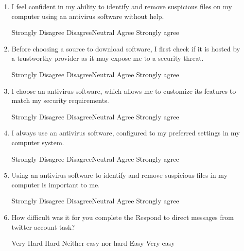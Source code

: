 \begin{enumerate}[noitemsep]
\item I feel confident in my ability to identify and remove suspicious files on my computer using an antivirus software without help.
\par Strongly Disagree \hspace{1cm} Disagree\hspace{1cm}Neutral\hspace{1cm} Agree\hspace{1cm} Strongly agree
\item Before choosing a source to download software, I first check if it is hosted by a trustworthy provider as it may expose me to a security threat.
\par Strongly Disagree \hspace{1cm} Disagree\hspace{1cm}Neutral\hspace{1cm} Agree\hspace{1cm} Strongly agree
\item I choose an antivirus software, which allows me to customize its features to match my security requirements.
\par Strongly Disagree \hspace{1cm} Disagree\hspace{1cm}Neutral\hspace{1cm} Agree\hspace{1cm} Strongly agree
\item I always use an antivirus software, configured to my preferred settings in my computer system.
\par Strongly Disagree \hspace{1cm} Disagree\hspace{1cm}Neutral\hspace{1cm} Agree\hspace{1cm} Strongly agree
\item Using an antivirus software to identify and remove suspicious files in my computer is important to me.
\par Strongly Disagree \hspace{1cm} Disagree\hspace{1cm}Neutral\hspace{1cm} Agree\hspace{1cm} Strongly agree
\item How difficult was it for you complete the Respond to direct messages from twitter account task?
\par Very Hard \hspace{1cm} Hard \hspace{1cm} Neither easy nor hard \hspace{1cm} Easy \hspace{1cm} Very easy

\end{enumerate}
